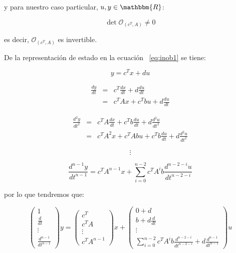 		y para nuestro caso particular, $u, y \in \mathbbm{R}$:

		\begin{equation*}
			\det{\mathcal{O}_{(c^T, A)}} \ne 0
		\end{equation*}

		es decir, $\mathcal{O}_{(c^T, A)}$ es invertible.

		De la representación de estado en la ecuación ~\ref{eq:inob1} se tiene:

		\begin{equation*}
			y = c^T x + d u
		\end{equation*}

		\begin{eqnarray*}
			\frac{dy}{dt} & = & c^T \frac{dx}{dt} + d \frac{du}{dt} \\
			& = & c^T A x + c^T b u + d \frac{du}{dt}
		\end{eqnarray*}

		\begin{eqnarray*}
			\frac{d^2y}{dt^2} & = & c^T A \frac{dx}{dt} + c^T b \frac{du}{dt} + d \frac{d^2u}{dt^2} \\
			& = & c^T A^2 x + c^T A b u + c^T b \frac{du}{dt} + d \frac{d^2u}{dt^2}
		\end{eqnarray*}

		\begin{equation*}
			\vdots
		\end{equation*}

		\begin{equation*}
			\frac{d^{n-1}y}{dt^{n-1}} = c^T A^{n-1} x + \sum_{i=0}^{n-2} c^T A^i b \frac{d^{n-2-i}u}{dt^{n-2-i}}
		\end{equation*}

		por lo que tendremos que:

		\begin{equation*}
			\begin{pmatrix}
				1 \\
				\frac{d}{dt} \\
				\vdots \\
				\frac{d^{n-1}}{dt^{n-1}}
			\end{pmatrix} y =
			\begin{pmatrix}
				c^T \\
				c^T A \\
				\vdots \\
				c^T A^{n-1}
			\end{pmatrix} x +
			\begin{pmatrix}
				0 + d \\
				b + d \frac{d}{dt} \\
				\vdots \\
				\sum_{i=0}^{n-2} c^T A^i b \frac{d^{n-2-i}}{dt^{n-2-i}} + d \frac{d^{n-1}}{dt^{n-1}}
			\end{pmatrix} u
		\end{equation*}

